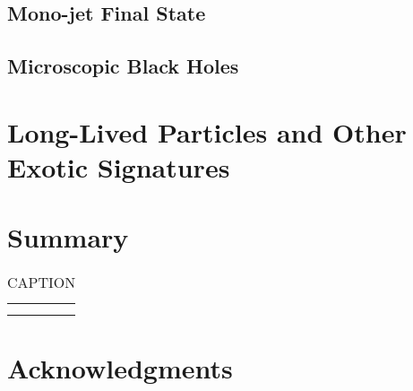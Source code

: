 \documentclass[11pt]{article}
\begin{document}
\subsection{Mono-jet Final State}

\subsection{Microscopic Black Holes}

\section{Long-Lived Particles and Other Exotic Signatures}\label{sec:longlivedplusothers}

\section{Summary}\label{sec:summary}

\begin{table}[htbp]
\caption{CAPTION}
\vspace{0.4cm}
\begin{center}
\begin{tabular}{|c|c|c|}
\hline
& & \\
& & \\ 
\hline
\end{tabular}
\end{center}
\end{table}


\section*{Acknowledgments}
\end{document}
